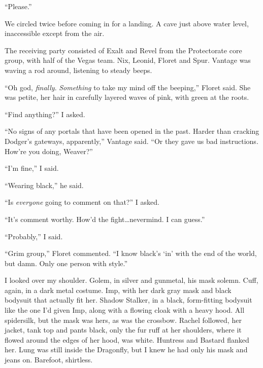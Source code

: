 ``Please.''



\blacksquare



We circled twice before coming in for a landing.  A cave just above water level, inaccessible except from the air.



The receiving party consisted of Exalt and Revel from the Protectorate core group, with half of the Vegas team.  Nix, Leonid, Floret and Spur.  Vantage was waving a rod around, listening to steady beeps.



``Oh god, \emph{finally}.  \emph{Something} to take my mind off the beeping,'' Floret said.  She was petite, her hair in carefully layered waves of pink, with green at the roots.



``Find anything?'' I asked.



``No signs of any portals that have been opened in the past.  Harder than cracking Dodger's gateways, apparently,'' Vantage said.  ``Or they gave us bad instructions.  How're you doing, Weaver?''



``I'm fine,'' I said.



``Wearing black,'' he said.



``Is \emph{everyone} going to comment on that?'' I asked.



``It's comment worthy.  How'd the fight\ldots nevermind.  I can guess.''



``Probably,'' I said.



``Grim group,'' Floret commented.  ``I know black's `in' with the end of the world, but damn.  Only one person with style.''



I looked over my shoulder.  Golem, in silver and gunmetal, his mask solemn.  Cuff, again, in a dark metal costume.  Imp, with her dark gray mask and black bodysuit that actually fit her.  Shadow Stalker, in a black, form-fitting bodysuit like the one I'd given Imp, along with a flowing cloak with a heavy hood.  All spidersilk, but the mask was hers, as was the crossbow.  Rachel followed, her jacket, tank top and pants black, only the fur ruff at her shoulders, where it flowed around the edges of her hood, was white.  Huntress and Bastard flanked her.  Lung was still inside the Dragonfly, but I knew he had only his mask and jeans on.  Barefoot, shirtless.



